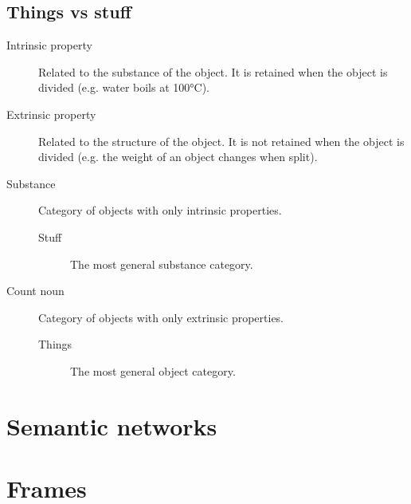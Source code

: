 \subsection{Things vs stuff}

\begin{description}
    \item[Intrinsic property] 
        Related to the substance of the object. It is retained when the object is divided
        (e.g. water boils at 100°C).

    \item[Extrinsic property] 
        Related to the structure of the object. It is not retained when the object is divided
        (e.g. the weight of an object changes when split).

    \item[Substance] 
        Category of objects with only intrinsic properties.

        \begin{description}
            \item[Stuff] 
                The most general substance category.
        \end{description}

    \item[Count noun] 
        Category of objects with only extrinsic properties.

        \begin{description}
            \item[Things] 
                The most general object category.
        \end{description}
\end{description}



\section{Semantic networks}



\section{Frames}
